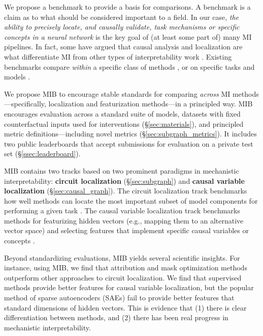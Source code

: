 \documentclass{article}
\theoremstyle{plain}
\theoremstyle{definition}
\theoremstyle{remark}
\newcommand{\variabletrack}{causal variable localization track}
\newcommand{\circuittrack}{circuit localization track}
\newcommand{\variablename}{causal variable localization}
\newcommand{\circuitname}{circuit localization}
\newcommand{\mib}{\textsf{MIB}}
\begin{document}
We propose a benchmark to provide a basis for comparisons. A benchmark is a claim as to what should be considered important to a field. In our case, \emph{the ability to precisely locate, and causally validate, task mechanisms or specific concepts in a neural network} is the key goal of (at least some part of) many MI pipelines. 
In fact, some have argued that causal analysis and localization are what differentiate MI from other types of interpretability work \cite{mueller2024questrightmediatorhistory,geiger2024causalabstractiontheoreticalfoundation,saphra2024mechanistic}.
Existing benchmarks compare \emph{within} a specific class of methods \cite{saebench, Schwettmann2023}, or on specific tasks and models \cite{arora2024,huang-etal-2024-ravel, miller2024transformer, gupta2024interpbench}.

We propose \mib{} to encourage stable standards for comparing \emph{across} MI methods---specifically, localization and featurization methods---in a principled way. \mib{} encourages evaluation across a standard suite of models, datasets with fixed counterfactual inputs used for interventions (\S\ref{sec:materials}), and principled metric definitions---including novel metrics (\S\ref{sec:subgraph_metrics}).
It includes two public leaderboards that accept submissions for evaluation on a private test set (\S\ref{ssec:leaderboard}).

\mib{} contains two tracks based on two prominent paradigms in mechanistic interpretability: \textbf{\circuitname{}} (\S\ref{sec:subgraph}) and \textbf{\variablename{}} (\S\ref{sec:causal_graph}). The \circuittrack{} benchmarks how well methods can locate the most important subset of model components for performing a given task \cite{Cao2020, wang2022interpretability, conmy2023towards}. The \variabletrack{}  benchmarks methods for featurizing hidden vectors (e.g., mapping them to an alternative vector space) and selecting features that implement specific causal variables or concepts \cite{vig2020,geiger2021, geiger2024causalabstractiontheoreticalfoundation, mueller2024questrightmediatorhistory}.

Beyond standardizing evaluations, \mib{} yields several scientific insights. For instance, 
using \mib{}, we find that attribution and mask optimization methods outperform other approaches to circuit localization. We find that supervised methods provide better features for causal variable localization, but the popular method of sparse autoencoders (SAEs) fail to provide better features that standard dimensions of hidden vectors. This is evidence that (1) there is clear differentiation between methods, and (2) there has been real progress in mechanistic interpretability.
\end{document}

